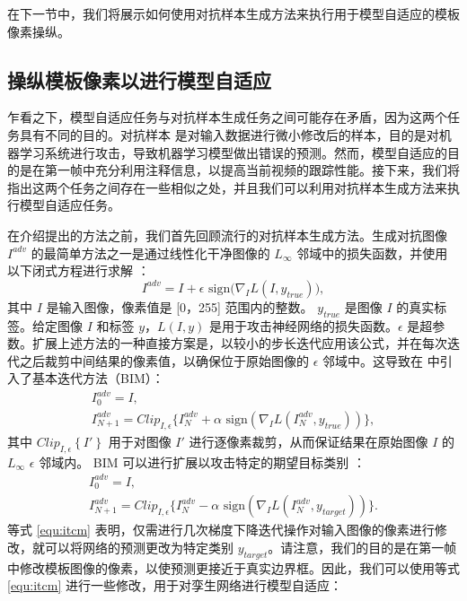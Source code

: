 在下一节中，我们将展示如何使用对抗样本生成方法来执行用于模型自适应的模板像素操纵。

\subsection{操纵模板像素以进行模型自适应}
乍看之下，模型自适应任务与对抗样本生成任务之间可能存在矛盾，因为这两个任务具有不同的目的。对抗样本 \cite{kurakin2017adversarial} 是对输入数据进行微小修改后的样本，目的是对机器学习系统进行攻击，导致机器学习模型做出错误的预测。然而，模型自适应的目的是在第一帧中充分利用注释信息，以提高当前视频的跟踪性能。接下来，我们将指出这两个任务之间存在一些相似之处，并且我们可以利用对抗样本生成方法来执行模型自适应任务。

在介绍提出的方法之前，我们首先回顾流行的对抗样本生成方法。生成对抗图像 $I^{adv}$ 的最简单方法之一是通过线性化干净图像的 $L_{\infty}$ 邻域中的损失函数，并使用以下闭式方程进行求解 \cite{FGSM}：
\begin{equation}
    I^{adv} = I + \epsilon \text{ sign} \bigl( \nabla_I L(I, y_{true})  \bigr),
\end{equation}
其中 $I$ 是输入图像，像素值是 [0，255] 范围内的整数。 $y_{true}$ 是图像 $I$ 的真实标签。给定图像 $I$ 和标签 $y$，$L(I, y)$ 是用于攻击神经网络的损失函数。$\epsilon$ 是超参数。扩展上述方法的一种直接方案是，以较小的步长迭代应用该公式，并在每次迭代之后裁剪中间结果的像素值，以确保位于原始图像的 $\epsilon$ 邻域中。这导致在 \cite{kurakin2017adversarial} 中引入了基本迭代方法（BIM）：
\begin{equation}
    \begin{gathered}
        I_0^{adv} = I, \\
        I_{N+1}^{adv} = Clip_{I,\epsilon}\{I_N^{adv}+\alpha \text{ sign}(\nabla_I L(I_N^{adv},y_{true}))\},
    \end{gathered}
\end{equation}
其中 $Clip_{I, \epsilon} \left\{ I' \right\}$ 用于对图像 $I'$ 进行逐像素裁剪，从而保证结果在原始图像 $I$ 的 $L_{\infty}$ $\epsilon$ 邻域内。
BIM 可以进行扩展以攻击特定的期望目标类别 \cite{kurakin2017adversarial}：
\begin{equation}
    \begin{gathered}
        I_0^{adv} = I,\\
        I_{N+1}^{adv} = Clip_{I,\epsilon}\{I_N^{adv}-\alpha \text{ sign}(\nabla_I L(I_N^{adv},y_{target}))\}.
    \end{gathered}
    \label{equ:itcm}
\end{equation}
等式 \ref{equ:itcm} 表明，仅需进行几次梯度下降迭代操作对输入图像的像素进行修改，就可以将网络的预测更改为特定类别 $y_{target}$。请注意，我们的目的是在第一帧中修改模板图像的像素，以使预测更接近于真实边界框。因此，我们可以使用等式 \ref{equ:itcm} 进行一些修改，用于对孪生网络进行模型自适应：
